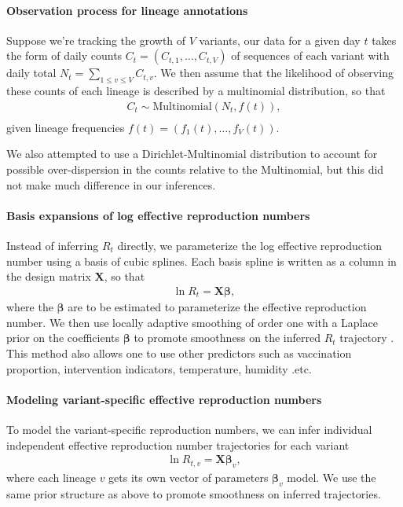 \documentclass[12pt]{article}
\renewcommand{\vec}[1]{\boldsymbol{#1}}
\begin{document}
\paragraph{Observation process for lineage annotations}%

Suppose we're tracking the growth of $V$ variants, our data for a given day $t$ takes the form of daily counts $C_{t} = (C_{t,1}, \ldots, C_{t,V})$ of sequences of each variant with daily total $N_{t} = \sum_{1\leq v \leq V} C_{t, v}$. 
We then assume that the likelihood of observing these counts of each lineage is described by a multinomial distribution, so that
\begin{align*}
    C_{t} \sim \text{Multinomial}(N_{t}, f(t)),\\
\end{align*}
given lineage frequencies $f(t) = (f_{1}(t), \ldots, f_{V}(t))$.

We also attempted to use a Dirichlet-Multinomial distribution to account for possible over-dispersion in the counts relative to the Multinomial, but this did not make much difference in our inferences.

\paragraph{Basis expansions of log effective reproduction numbers}%

Instead of inferring $R_{t}$ directly, we parameterize the log effective reproduction number using a basis of cubic splines. 
Each basis spline is written as a column in the design matrix $\vec{X}$, so that 
\begin{align*}
  \ln R_{t} = \vec{X} \vec{\beta},
\end{align*}
where the $\vec{\beta}$ are to be estimated to parameterize the effective reproduction number.
We then use locally adaptive smoothing of order one with a Laplace prior on the coefficients $\vec{\beta}$ to promote smoothness on the inferred $R_t$ trajectory \cite{Faulkner2018}. 
This method also allows one to use other predictors such as vaccination proportion, intervention indicators, temperature, humidity .etc. 

\paragraph{Modeling variant-specific effective reproduction numbers}

To model the variant-specific reproduction numbers, we can infer individual independent effective reproduction number trajectories for each variant 
\begin{align*}
  \ln R_{t, v} = \vec{X} \vec{\beta}_{v},
\end{align*}
where each lineage $v$ gets its own vector of parameters $\vec{\beta}_{v}$ model. 
We use the same prior structure as above to promote smoothness on inferred trajectories.
\end{document}
